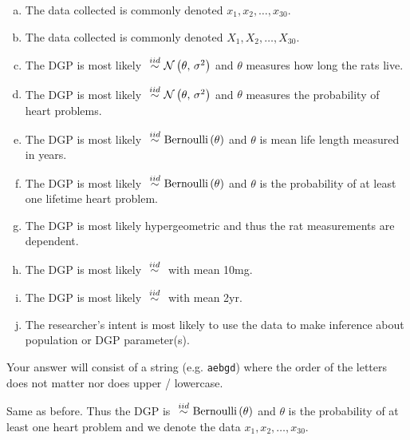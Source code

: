 \documentclass[12pt,landscape]{article}
\newcommand{\instr}{\small Your answer will consist of a string (e.g. \texttt{aebgd}) where the order of the letters does not matter nor does upper / lowercase. \normalsize}
\begin{document}
\vspace{-0.2cm}\benum{} 

\begin{enumerate}[(a)]
\item The data collected is commonly denoted $x_1, x_2, \ldots, x_{30}$.
\item The data collected is commonly denoted $X_1, X_2, \ldots, X_{30}$.
\item The DGP is most likely $\iid \normnot{\theta}{\sigsq}$ and $\theta$ measures how long the rats live.
\item The DGP is most likely $\iid \normnot{\theta}{\sigsq}$ and $\theta$ measures the probability of heart problems.
\item The DGP is most likely $\iid \bernoulli{\theta}$ and $\theta$ is mean life length measured in years.
\item The DGP is most likely $\iid \bernoulli{\theta}$ and $\theta$ is the probability of at least one lifetime heart problem.
\item The DGP is most likely hypergeometric and thus the rat measurements are dependent.
\item The DGP is most likely $\iid$ with mean 10mg.
\item The DGP is most likely $\iid$ with mean 2yr.
\item The researcher's intent is most likely to use the data to make inference about population or DGP parameter(s).
\end{enumerate}
\eenum\instr\pagebreak





\problem{} Same as before.  Thus the DGP is $\iid \bernoulli{\theta}$ and $\theta$ is the probability of at least one heart problem and we denote the data $x_1, x_2, \ldots, x_{30}$.
\end{document}
